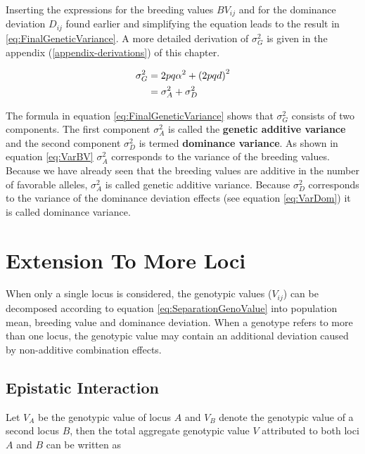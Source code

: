 \documentclass[
]{book}
\theoremstyle{definition}
\theoremstyle{definition}
\theoremstyle{definition}
\theoremstyle{remark}
\begin{document}
Inserting the expressions for the breeding values \(BV_{ij}\) and for the dominance deviation \(D_{ij}\) found earlier and simplifying the equation leads to the result in \eqref{eq:FinalGeneticVariance}. A more detailed derivation of \(\sigma_G^2\) is given in the appendix (\ref{appendix-derivations}) of this chapter.

\begin{align}
  \sigma_G^2 &=  2pq\alpha^2 + \left(2pqd \right)^2 \notag\\
             &=  \sigma_A^2 + \sigma_D^2
\label{eq:FinalGeneticVariance}             
\end{align}

The formula in equation \eqref{eq:FinalGeneticVariance} shows that \(\sigma_G^2\) consists of two components. The first component \(\sigma_A^2\) is called the \textbf{genetic additive variance} and the second component \(\sigma_D^2\) is termed \textbf{dominance variance}. As shown in equation \eqref{eq:VarBV} \(\sigma_A^2\) corresponds to the variance of the breeding values. Because we have already seen that the breeding values are additive in the number of favorable alleles, \(\sigma_A^2\) is called genetic additive variance. Because \(\sigma_D^2\) corresponds to the variance of the dominance deviation effects (see equation \eqref{eq:VarDom}) it is called dominance variance.

\hypertarget{extension-to-more-loci}{%
\section{Extension To More Loci}\label{extension-to-more-loci}}

When only a single locus is considered, the genotypic values (\(V_{ij}\)) can be decomposed according to equation \eqref{eq:SeparationGenoValue} into population mean, breeding value and dominance deviation. When a genotype refers to more than one locus, the genotypic value may contain an additional deviation caused by non-additive combination effects.

\hypertarget{epistatic-interaction}{%
\subsection{Epistatic Interaction}\label{epistatic-interaction}}

Let \(V_A\) be the genotypic value of locus \(A\) and \(V_B\) denote the genotypic value of a second locus \(B\), then the total aggregate genotypic value \(V\) attributed to both loci \(A\) and \(B\) can be written as
\end{document}
